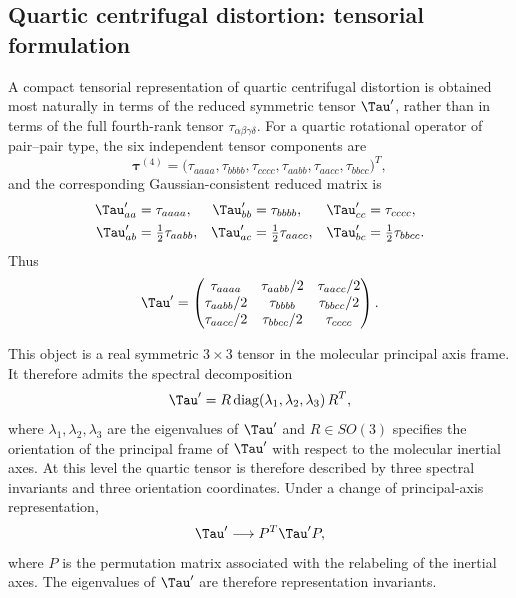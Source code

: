 \subsection{Quartic centrifugal distortion: tensorial formulation}

A compact tensorial representation of quartic centrifugal distortion is obtained
most naturally in terms of the reduced symmetric tensor $\Tau'$, rather than in
terms of the full fourth-rank tensor
$\tau_{\alpha\beta\gamma\delta}$.
For a quartic rotational operator of pair--pair type, the six independent tensor
components are
\[
\boldsymbol\tau^{(4)}=
\bigl(
\tau_{aaaa},\tau_{bbbb},\tau_{cccc},
\tau_{aabb},\tau_{aacc},\tau_{bbcc}
\bigr)^T,
\]
and the corresponding Gaussian-consistent reduced matrix is
\begin{align}
\Tau'_{aa} &= \tau_{aaaa}, &
\Tau'_{bb} &= \tau_{bbbb}, &
\Tau'_{cc} &= \tau_{cccc}, \\
\Tau'_{ab} &= \tfrac12 \tau_{aabb}, &
\Tau'_{ac} &= \tfrac12 \tau_{aacc}, &
\Tau'_{bc} &= \tfrac12 \tau_{bbcc}.
\end{align}
Thus
\begin{equation}
\Tau'=
\begin{pmatrix}
\tau_{aaaa} & \tau_{aabb}/2 & \tau_{aacc}/2 \\
\tau_{aabb}/2 & \tau_{bbbb} & \tau_{bbcc}/2 \\
\tau_{aacc}/2 & \tau_{bbcc}/2 & \tau_{cccc}
\end{pmatrix}.
\label{eq:tauprime_matrix}
\end{equation}

This object is a real symmetric $3\times 3$ tensor in the molecular principal
axis frame.  It therefore admits the spectral decomposition
\begin{equation}
\Tau' = R\,\mathrm{diag}(\lambda_1,\lambda_2,\lambda_3)\,R^{T},
\label{eq:tauprime_spectral}
\end{equation}
where $\lambda_1,\lambda_2,\lambda_3$ are the eigenvalues of $\Tau'$ and
$R\in SO(3)$ specifies the orientation of the principal frame of $\Tau'$ with
respect to the molecular inertial axes.  At this level the quartic tensor is
therefore described by three spectral invariants and three orientation
coordinates.  Under a change of principal-axis representation,
\begin{equation}
\Tau' \longrightarrow P^{T}\Tau' P,
\end{equation}
where $P$ is the permutation matrix associated with the relabeling of the
inertial axes.  The eigenvalues of $\Tau'$ are therefore representation
invariants.

